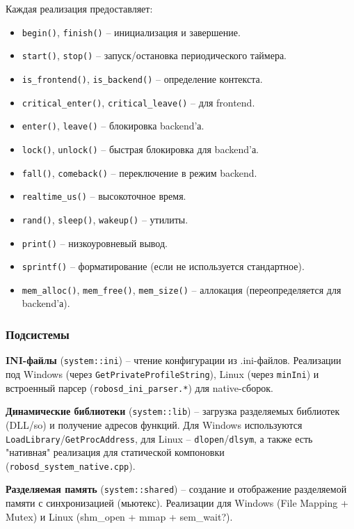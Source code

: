 \documentclass[a4paper,12pt]{article}
\begin{document}
Каждая реализация предоставляет:
\begin{itemize}
    \item \texttt{begin()}, \texttt{finish()} -- инициализация и завершение.
    \item \texttt{start()}, \texttt{stop()} -- запуск/остановка периодического таймера.
    \item \texttt{is\_frontend()}, \texttt{is\_backend()} -- определение контекста.
    \item \texttt{critical\_enter()}, \texttt{critical\_leave()} -- для frontend.
    \item \texttt{enter()}, \texttt{leave()} -- блокировка backend'а.
    \item \texttt{lock()}, \texttt{unlock()} -- быстрая блокировка для backend'а.
    \item \texttt{fall()}, \texttt{comeback()} -- переключение в режим backend.
    \item \texttt{realtime\_us()} -- высокоточное время.
    \item \texttt{rand()}, \texttt{sleep()}, \texttt{wakeup()} -- утилиты.
    \item \texttt{print()} -- низкоуровневый вывод.
    \item \texttt{sprintf()} -- форматирование (если не используется стандартное).
    \item \texttt{mem\_alloc()}, \texttt{mem\_free()}, \texttt{mem\_size()} -- аллокация (переопределяется для backend'а).
\end{itemize}

\subsubsection{Подсистемы}

\textbf{INI-файлы} (\texttt{system::ini}) -- чтение конфигурации из .ini-файлов. Реализации под Windows (через \texttt{GetPrivateProfileString}), Linux (через \texttt{minIni}) и встроенный парсер (\texttt{robosd\_ini\_parser.*}) для native-сборок.

\textbf{Динамические библиотеки} (\texttt{system::lib}) -- загрузка разделяемых библиотек (DLL/so) и получение адресов функций. Для Windows используются \texttt{LoadLibrary}/\texttt{GetProcAddress}, для Linux -- \texttt{dlopen}/\texttt{dlsym}, а также есть "нативная" реализация для статической компоновки (\texttt{robosd\_system\_native.cpp}).

\textbf{Разделяемая память} (\texttt{system::shared}) -- создание и отображение разделяемой памяти с синхронизацией (мьютекс). Реализации для Windows (File Mapping + Mutex) и Linux (shm\_open + mmap + sem\_wait?).
\end{document}
